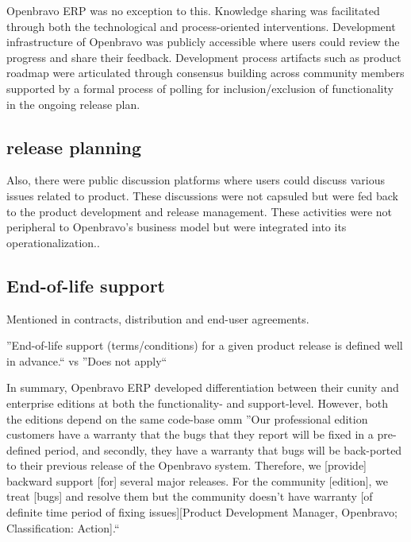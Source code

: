  Openbravo ERP was no exception to this. Knowledge sharing was facilitated through both the technological and process-oriented interventions. Development infrastructure of Openbravo was publicly accessible where users could review the progress and share their feedback. Development process artifacts such as product roadmap were articulated through consensus building across community members supported by a formal process of polling for inclusion/exclusion of functionality in the ongoing release plan. \citep{DeodharSaxena_et_al2012} 
 

 \subsection{release planning}
 
 Also, there were public discussion platforms where users could discuss various issues related to product. These discussions were not capsuled but were fed back to the product development and release management. These activities were not peripheral to Openbravo’s business model but were integrated into its operationalization.\citep{DeodharSaxena_et_al2012}.
 
 
 \subsection{End-of-life support }
 
 Mentioned in contracts, distribution and end-user agreements. 
 
 ''End-of-life support (terms/conditions) for 
a given product release is defined well in 
advance.`` vs  ''Does not apply``  \citep{VitharanaKing_et_al2010}


In summary, Openbravo ERP developed differentiation between their cunity and enterprise editions at both the functionality- and support-level. However, both the editions depend on the same code-base \citep{DeodharSaxena_et_al2012}
omm
''Our professional edition customers have a warranty that the bugs that they report will be fixed in a pre-defined period, and secondly, they have a warranty that bugs will be back-ported to their previous release of the Openbravo system. Therefore, we [provide] backward support [for] several major releases. For the community [edition], we treat [bugs] and resolve them but the community doesn’t have warranty [of definite time period of fixing issues][Product Development Manager, Openbravo; Classification: Action].`` 
\citep{DeodharSaxena_et_al2012}



